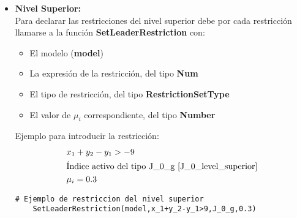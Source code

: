 \begin{itemize}
    \item \textbf{Nivel Superior:}\\

Para declarar las restricciones del nivel superior debe por cada restricción
llamarse a la función \textbf{SetLeaderRestriction} con:
\begin{itemize}
    \item El modelo (\textbf{model})
    \item La expresión de la restricción, del tipo \textbf{Num}
    \item El tipo de restricción, del tipo \textbf{RestrictionSetType}
    \item El valor de $\mu_i$ correspondiente, del tipo \textbf{Number} 
\end{itemize}

Ejemplo para introducir la restricción:
\begin{align*}
    &x_1+y_2-y_1 > -9 \\
    &\text{Índice activo del tipo J\_0\_g \refeq{J_0_level_superior}}\\
    & \mu_i=0.3
\end{align*}

\begin{lstlisting}[caption={Introducir restricción del nivel superior}]
    # Ejemplo de restriccion del nivel superior
    SetLeaderRestriction(model,x_1+y_2-y_1>9,J_0_g,0.3)
\end{lstlisting}

\end{itemize}
